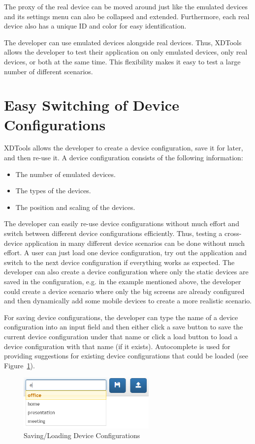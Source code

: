 The proxy of the real device can be moved around just like the emulated devices and its settings menu can also be collapsed and extended. Furthermore, each real device also has a unique ID and color for easy identification.

The developer can use emulated devices alongside real devices. Thus, XDTools allows the developer to test their application on only emulated devices, only real devices, or both at the same time. This flexibility makes it easy to test a large number of different scenarios.

\section{Easy Switching of Device Configurations}

XDTools allows the developer to create a device configuration, save it for later, and then re-use it. A device configuration consists of the following information:
\begin{itemize}
	\item The number of emulated devices.
	\item The types of the devices.
	\item The position and scaling of the devices.
\end{itemize}
The developer can easily re-use device configurations without much effort and switch between different device configurations efficiently. Thus, testing a cross-device application in many different device scenarios can be done without much effort. A user can just load one device configuration, try out the application and switch to the next device configuration if everything works as expected. The developer can also create a device configuration where only the static devices are saved in the configuration, e.g. in the example mentioned above, the developer could create a device scenario where only the big screens are already configured and then dynamically add some mobile devices to create a more realistic scenario.

For saving device configurations, the developer can type the name of a device configuration into an input field and then either click a save button to save the current device configuration under that name or click a load button to load a device configuration with that name (if it exists). Autocomplete is used for providing suggestions for existing device configurations that could be loaded (see Figure~\ref{fig:session_management}). 

\begin{figure}[H]
  \centering
    \includegraphics[width=0.6\textwidth]{images/screenshots/session_management_2.png}
	\caption[Screenshot: Saving/Loading device configurations]{Saving/Loading Device Configurations}
	\label{fig:session_management}
\end{figure}

